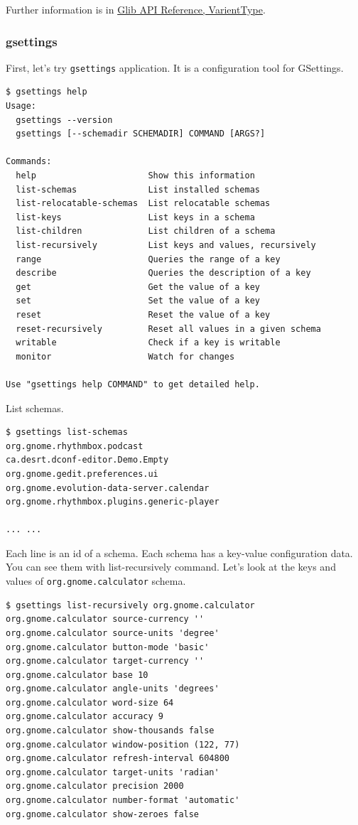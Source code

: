 Further information is in
\href{https://docs.gtk.org/glib/struct.VariantType.html}{Glib API
Reference, VarientType}.

\hypertarget{gsettings-1}{%
\subsubsection{gsettings}\label{gsettings-1}}

First, let's try \passthrough{\lstinline!gsettings!} application. It is
a configuration tool for GSettings.

\begin{lstlisting}
$ gsettings help
Usage:
  gsettings --version
  gsettings [--schemadir SCHEMADIR] COMMAND [ARGS?]

Commands:
  help                      Show this information
  list-schemas              List installed schemas
  list-relocatable-schemas  List relocatable schemas
  list-keys                 List keys in a schema
  list-children             List children of a schema
  list-recursively          List keys and values, recursively
  range                     Queries the range of a key
  describe                  Queries the description of a key
  get                       Get the value of a key
  set                       Set the value of a key
  reset                     Reset the value of a key
  reset-recursively         Reset all values in a given schema
  writable                  Check if a key is writable
  monitor                   Watch for changes

Use "gsettings help COMMAND" to get detailed help.
\end{lstlisting}

List schemas.

\begin{lstlisting}
$ gsettings list-schemas
org.gnome.rhythmbox.podcast
ca.desrt.dconf-editor.Demo.Empty
org.gnome.gedit.preferences.ui
org.gnome.evolution-data-server.calendar
org.gnome.rhythmbox.plugins.generic-player

... ...
\end{lstlisting}

Each line is an id of a schema. Each schema has a key-value
configuration data. You can see them with list-recursively command.
Let's look at the keys and values of
\passthrough{\lstinline!org.gnome.calculator!} schema.

\begin{lstlisting}
$ gsettings list-recursively org.gnome.calculator
org.gnome.calculator source-currency ''
org.gnome.calculator source-units 'degree'
org.gnome.calculator button-mode 'basic'
org.gnome.calculator target-currency ''
org.gnome.calculator base 10
org.gnome.calculator angle-units 'degrees'
org.gnome.calculator word-size 64
org.gnome.calculator accuracy 9
org.gnome.calculator show-thousands false
org.gnome.calculator window-position (122, 77)
org.gnome.calculator refresh-interval 604800
org.gnome.calculator target-units 'radian'
org.gnome.calculator precision 2000
org.gnome.calculator number-format 'automatic'
org.gnome.calculator show-zeroes false
\end{lstlisting}

